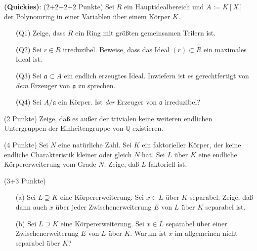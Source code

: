 \documentclass{algsheet}
\author{Dipl.-Math.~Franz Vogler}
\date{18.~Juli 2011}
\begin{document}
                \maketitle





\begin{exercise}\textbf{(Quickies)}: (2+2+2+2 Punkte)\newline
  Sei $R$ ein Hauptidealbereich und $A := K[X]$ der Polynomring in einer Variablen über einem
  Körper $K$.  
  \begin{itemize}
    \item[\textbf(Q1)] Zeige, dass $R$ ein Ring mit größten gemeinsamen
                       Teilern ist.
    \item[\textbf(Q2)] Sei $r \in R$ irreduzibel. Beweise, dass das Ideal $(r) \subset R$ ein 
                       maximales Ideal ist.
    \item[\textbf(Q3)] Sei $\mathfrak a \subset A$ ein endlich erzeugtes Ideal. Inwiefern ist es gerechtfertigt
                       von \emph{dem} Erzeuger von $\mathfrak a$ zu sprechen.
    \item[\textbf(Q4)] Sei $A/\mathfrak a$ ein Körper. Ist \emph{der} Erzeuger von $\mathfrak a$
                       irreduzibel?
  \end{itemize}
 
\end{exercise}



\begin{exercise}(2 Punkte)\newline
    Zeige, daß es außer der trivialen keine weiteren endlichen Untergruppen der
    Einheitengruppe von \(\mathbb Q\) existieren.
\end{exercise}

\begin{exercise}(4 Punkte)\newline
    Sei \(N\) eine natürliche Zahl.
    Sei \(K\) ein faktorieller Körper, der keine endliche Charakteristik kleiner
    oder gleich \(N\) hat. Sei \(L\) über \(K\) eine endliche Körpererweiterung vom
    Grade \(N\). Zeige, daß \(L\) faktoriell ist.
\end{exercise}





\begin{exercise}(3+3 Punkte)\vspace{-1ex}
   \begin{itemize}
      \item[(a)]     Sei \(L \supseteq K\) eine Körpererweiterung. Sei \(x \in L\) über \(K\)
    separabel. Zeige, daß dann auch \(x\) über jeder Zwischenerweiterung \(E\)
    von \(L\) über \(K\) separabel ist.
      \item[(b)]    Sei \(L \supseteq K\) eine Körpererweiterung. Sei \(x \in L\) separabel
    über einer Zwischenerweiterung \(E\) von \(L\) über \(K\). Warum ist \(x\)
    im allgemeinen nicht separabel über \(K\)?
   \end{itemize}
\end{exercise}
\end{document}
